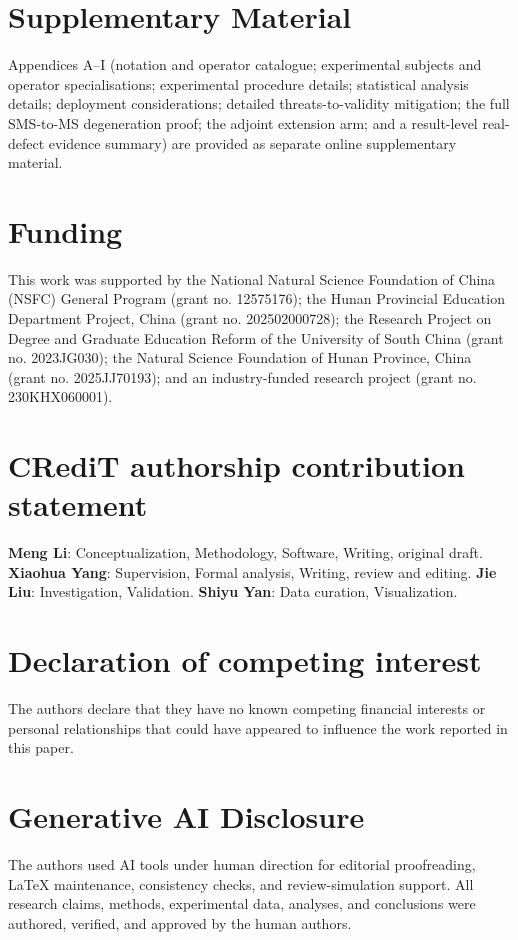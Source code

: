 \documentclass[manuscript,screen,review]{acmart}
\begin{document}


\section*{Supplementary Material}

Appendices A--I (notation and operator catalogue; experimental subjects and
operator specialisations; experimental procedure details; statistical analysis
details; deployment considerations; detailed threats-to-validity mitigation;
the full SMS-to-MS degeneration proof; the adjoint extension arm; and a
result-level real-defect evidence summary) are provided as separate online
supplementary material.

\section*{Funding}

This work was supported by the National Natural Science Foundation of China
(NSFC) General Program (grant no. 12575176); the Hunan Provincial Education
Department Project, China (grant no. 202502000728); the Research Project on
Degree and Graduate Education Reform of the University of South China (grant
no. 2023JG030); the Natural Science Foundation of Hunan Province, China (grant
no. 2025JJ70193); and an industry-funded research project (grant no.
230KHX060001).

\section*{CRediT authorship contribution statement}

\textbf{Meng Li}: Conceptualization, Methodology, Software, Writing, original
draft. \textbf{Xiaohua Yang}: Supervision, Formal analysis, Writing, review
and editing. \textbf{Jie Liu}: Investigation, Validation. \textbf{Shiyu Yan}:
Data curation, Visualization.

\section*{Declaration of competing interest}

The authors declare that they have no known competing financial interests or
personal relationships that could have appeared to influence the work reported
in this paper.

\section*{Generative AI Disclosure}

The authors used AI tools under human direction for editorial proofreading,
LaTeX maintenance, consistency checks, and review-simulation support. All
research claims, methods, experimental data, analyses, and conclusions were
authored, verified, and approved by the human authors.



\end{document}
